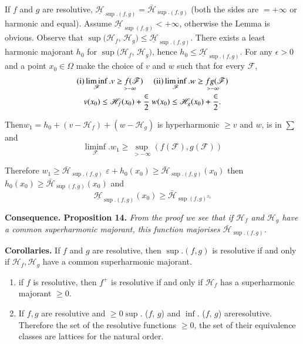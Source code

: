 \begin{Basic Lemma} %
  If $f $ and $g$ are resolutive, $\underline {\mathscr{H}}_{
  \sup. (f, g)} = \bar{\mathscr{H}}_{\sup. (f, g)}$  (both the
  sides are $= + \infty$ or harmonic and equal). Assume
  $\underline{\mathscr{H}}_{\sup (f, g)}<  + \infty$, otherwise
  the Lemma is obvious. Observe that $\sup (\mathscr{H}_f$,
  $\mathscr{H}_g) \le \underline{\mathscr{H}}_{\sup. (f, g)}$. There
  exists a least harmonic majorant $h_0$ for $\sup(\mathscr{H}_f$,
  $\mathscr{H}_g)$, hence $h_0 \le \underline{\mathscr{H}}_{
  \sup. (f, g)}$. For any $\epsilon > 0$ and a point $x_0 \in \Omega$
  make the choice of $v$ and $w$ such that for every $\mathscr{F}$, 
  \begin{gather*}
    {\rm(i)} \liminf \limits_{\mathscr{F}}.v \underset{> - \infty}{\ge f
      (\mathscr{F})}\quad {\rm(ii)}\liminf \limits_{\mathscr{F}}.w \underset{> -
      \infty}{\ge fg(\mathscr{F})}\\ 
    v(x_0) \le \mathscr{H}_f (x_0) + \frac{\in}{2}~  w(x_0) \le \mathscr{H}_g
    (x_0) + \frac{\in}{2}.  
  \end{gather*}

  Then\pageoriginale $w_1 = h_0 + (v - \mathscr{H}_f ) + (w - \mathscr{H}_g)$ is
  hyperharmonic $\geq v$ and $w$, is in $\sum$ and  
  $$
  \liminf _{\mathscr{F}}.w_1  \ge \sup_{> - \infty}(f (\mathscr{F}), g
  (\mathscr{F})) 
  $$

  Therefore $w_1 \ge \bar{\mathscr{H}}_{\sup. (f, g)}$ $\varepsilon
  + h_0 (x_0) \ge \bar{\mathscr{H}}_{\sup. (f, g)} (x_0)$ then
  $h_0 (x_0) \ge \bar{\mathscr{H}}_{\sup (f, g )} (x_0)$ and  
  $$
  \underline{\mathscr{H}}_{\sup.(f,g)}(x_0) \ge \bar{\mathscr{H}}_{\sup(f,g)^{x_0}}
  $$
\end{Basic Lemma}

\medskip
\noindent 
\textbf{Consequence. Proposition 14.}\label{p4:chap5:sec24:prop14} %
\textit{From the proof we see that if $\mathscr{H}_f$ and $\mathscr{H}_g$
 have a common superharmonic majorant, this function majorises
 $\bar{\mathscr{H}}_{\sup. (f, g)}$.} 

\noindent
\textbf{Corollaries.} 
If $f $ and $g$ are resolutive, then $\sup.(f,g)$ is resolutive if and
only if $\mathscr{H}_f,  \mathscr{H}_g$ have a common superharmonic
majorant. 

\begin{example*} 
  \begin{enumerate}[1)]
  \item if $f$ is resolutive, then $f^+$ is resolutive if and only if
    $\mathscr{H}_f$ has a superharmonic majorant $\geq 0$. 
  \item  If $f,g$ are resolutive and $\ge 0 \sup$. ($f$, $g$) and
    $\inf$. ($f$, $g$) are\pageoriginale resolutive. Therefore the set of the
    resolutive functions $\ge 0$, the set of their equivalence classes
    are lattices for the natural order. 
  \end{enumerate}
\end{example*}
 
